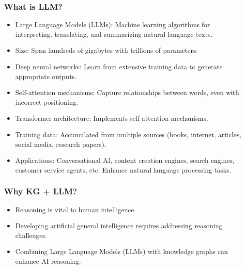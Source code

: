


\begin{frame}[fragile]\frametitle{What is LLM?}

\begin{itemize}
\item Large Language Models (LLMs): Machine learning algorithms for interpreting, translating, and summarizing natural language texts.
\item Size: Span hundreds of gigabytes with trillions of parameters.
\item Deep neural networks: Learn from extensive training data to generate appropriate outputs.
\item Self-attention mechanisms: Capture relationships between words, even with incorrect positioning.
\item Transformer architecture: Implements self-attention mechanisms.
\item Training data: Accumulated from multiple sources (books, internet, articles, social media, research papers).
\item Applications: Conversational AI, content creation engines, search engines, customer service agents, etc.
Enhance natural language processing tasks.
\end{itemize}

\end{frame}




\begin{frame}[fragile]\frametitle{Why KG + LLM?}
    \begin{itemize}
        \item Reasoning is vital to human intelligence.
        \item Developing artificial general intelligence requires addressing reasoning challenges.
        \item Combining Large Language Models (LLMs) with knowledge graphs can enhance AI reasoning.
    \end{itemize}
\end{frame}



